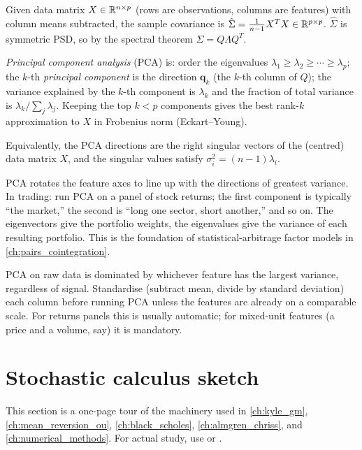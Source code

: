 Given data matrix $X \in \mathbb{R}^{n \times p}$ (rows are observations,
columns are features) with column means subtracted, the sample
covariance is $\hat\Sigma = \frac{1}{n-1} X^T X \in \mathbb{R}^{p\times p}$.
$\hat\Sigma$ is symmetric PSD, so by the spectral theorem
$\hat\Sigma = Q \Lambda Q^T$.

\emph{Principal component analysis} (PCA) is: order the eigenvalues
$\lambda_1 \ge \lambda_2 \ge \cdots \ge \lambda_p$; the $k$-th
\emph{principal component} is the direction $\bm{q}_k$ (the $k$-th column
of $Q$); the variance explained by the $k$-th component is $\lambda_k$
and the fraction of total variance is $\lambda_k / \sum_j \lambda_j$.
Keeping the top $k < p$ components gives the best rank-$k$ approximation
to $X$ in Frobenius norm (Eckart--Young).

Equivalently, the PCA directions are the right singular vectors of the
(centred) data matrix $X$, and the singular values satisfy
$\sigma_i^2 = (n-1)\lambda_i$.

\begin{intuitionbox}
PCA rotates the feature axes to line up with the directions of greatest
variance. In trading: run PCA on a panel of stock returns; the first
component is typically ``the market,'' the second is ``long one sector,
short another,'' and so on. The eigenvectors give the portfolio weights,
the eigenvalues give the variance of each resulting portfolio. This is
the foundation of statistical-arbitrage factor models in
\cref{ch:pairs_cointegration}.
\end{intuitionbox}

\begin{pitfallbox}
PCA on raw data is dominated by whichever feature has the largest
variance, regardless of signal. Standardise (subtract mean, divide by
standard deviation) each column before running PCA unless the features
are already on a comparable scale. For returns panels this is usually
automatic; for mixed-unit features (a price and a volume, say) it is
mandatory.
\end{pitfallbox}

\section{Stochastic calculus sketch}
\label{sec:app_math_stoch}

This section is a one-page tour of the machinery used in
\cref{ch:kyle_gm}, \cref{ch:mean_reversion_ou}, \cref{ch:black_scholes},
\cref{ch:almgren_chriss}, and \cref{ch:numerical_methods}. For actual
study, use \citet{oksendal2003stochastic} or \citet{shreve2004stochastic}.

